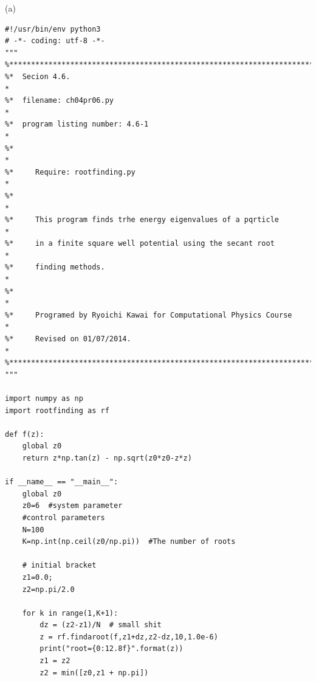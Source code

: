 \bigskip\noindent
\program (a)
\footnotesize
\begin{verbatim}
#!/usr/bin/env python3
# -*- coding: utf-8 -*-
"""
%**************************************************************************
%*  Secion 4.6.                                                           *
%*  filename: ch04pr06.py                                                 *
%*  program listing number: 4.6-1                                         *
%*                                                                        *
%*     Require: rootfinding.py                                            *
%*                                                                        *
%*     This program finds trhe energy eigenvalues of a pqrticle           *
%*     in a finite square well potential using the secant root            *
%*     finding methods.                                                   *
%*                                                                        *
%*     Programed by Ryoichi Kawai for Computational Physics Course        *
%*     Revised on 01/07/2014.                                             *
%**************************************************************************
"""

import numpy as np
import rootfinding as rf

def f(z):
    global z0
    return z*np.tan(z) - np.sqrt(z0*z0-z*z)

if __name__ == "__main__":
    global z0
    z0=6  #system parameter
    #control parameters
    N=100
    K=np.int(np.ceil(z0/np.pi))  #The number of roots

    # initial bracket
    z1=0.0;
    z2=np.pi/2.0

    for k in range(1,K+1):  
        dz = (z2-z1)/N  # small shit
        z = rf.findaroot(f,z1+dz,z2-dz,10,1.0e-6)
        print("root={0:12.8f}".format(z))
        z1 = z2
        z2 = min([z0,z1 + np.pi])

\end{verbatim}
\normalsize

